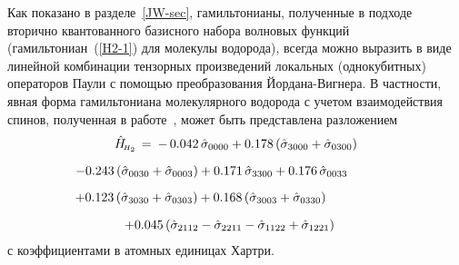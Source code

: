 \documentclass[a4paper]{report}
\begin{document}
Как показано в разделе~\ref{JW-sec}, гамильтонианы, полученные в подходе вторично квантованного базисного набора волновых функций (гамильтониан~(\ref{H2-1}) для молекулы водорода), всегда можно выразить в виде линейной комбинации тензорных произведений локальных (однокубитных) операторов Паули с помощью преобразования Йордана-Вигнера. В частности, явная форма гамильтониана молекулярного водорода с учетом взаимодействия спинов, полученная в работе~\cite{Du2022}, может быть представлена разложением
\begin{multline}\label{H2-2}
\hat{H}_{\!\scriptscriptstyle H_2}\, =\: -\,0.042\,\hat{\sigma}_{0000}+ 0.178\,(\hat{\sigma}_{3000}+ \hat{\sigma}_{0300})
\\
\,-0.243\,(\hat{\sigma}_{0030}+ \hat{\sigma}_{0003})+ 0.171\,\hat{\sigma}_{3300}+ 0.176\,\hat{\sigma}_{0033}\qquad\qquad \vphantom{\int}
\\
\,\;+0.123\,(\hat{\sigma}_{3030}+ \hat{\sigma}_{0303})+
0.168\,(\hat{\sigma}_{3003}+ \hat{\sigma}_{0330})\qquad\qquad\qquad
\\
+0.045\,(\hat{\sigma}_{2112}- \hat{\sigma}_{2211}- \hat{\sigma}_{1122} + \hat{\sigma}_{1221})\quad\vphantom{\overbrace{AA}}
\end{multline}
с коэффициентами в атомных единицах Хартри.
\end{document}
